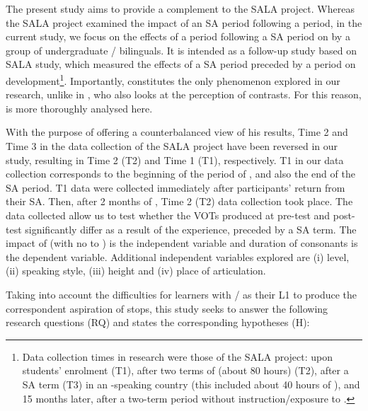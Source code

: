 \documentclass[output=paper]{langsci/langscibook}
\begin{document}
The present study aims to provide a complement to the SALA project. Whereas the SALA project examined the impact of an SA period following a  period, in the current study, we focus on the effects of a  period following a SA period on   by a group of undergraduate / bilinguals. It is intended as a follow-up study based on  SALA study, which measured the effects of a SA period preceded by a  period on   development\footnote{Data collection times in  research were those of the SALA project: upon students’ enrolment (T1), after two terms of  (about 80 hours) (T2), after a SA term (T3) in an -speaking country (this included about 40 hours of ), and 15 months later, after a two-term period without instruction/exposure to .}. Importantly,  constitutes the only phenomenon explored in our research, unlike in \citet{Mora2008}, who also looks at the perception of  contrasts. For this reason,  is more thoroughly analysed here.



With the purpose of offering a counterbalanced view of his results, Time 2 and Time 3 in the data collection of the SALA project have been reversed in our study, resulting in Time 2 (T2) and Time 1 (T1), respectively. T1 in our data collection corresponds to the beginning of the period of , and also the end of the SA period. T1 data were collected immediately after participants’ return from their SA. Then, after 2 months of , Time 2 (T2) data collection took place. The data collected allow us to test whether the VOTs produced at pre-test and post-test significantly differ as a result of the  experience, preceded by a SA term. The impact of  (with no  to ) is the independent variable and  duration of    consonants is the dependent variable. Additional independent variables explored are (i)  level, (ii) speaking style, (iii)  height and (iv) place of articulation. 



Taking into account the difficulties for  learners with / as their L1 to produce the correspondent aspiration of   stops, this study seeks to answer the following research questions (RQ) and states the corresponding hypotheses (H): 
\end{document}
